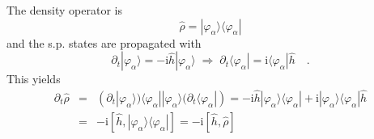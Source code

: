 \documentclass[final,1p]{elsarticle}
\begin{document}
The density operator is
\begin{equation}
  \hat{\rho}
  =
  |\varphi_\alpha\rangle\langle\varphi_\alpha|
\end{equation}
and the s.p. states are propagated with
\begin{equation}
  \partial_t|\varphi_\alpha\rangle
  =
  -\mathrm{i}\hat{h}|\varphi_\alpha\rangle
  \;\Rightarrow\;
  \partial_t\langle\varphi_\alpha|
  =
  \mathrm{i}\langle\varphi_\alpha|\hat{h}
  \quad.
\end{equation}
This yields
\begin{eqnarray*}
  \partial_t\hat{\rho}
  &=&
  (\partial_t|\varphi_\alpha\rangle)\langle\varphi_\alpha|
  |\varphi_\alpha\rangle(\partial_t\langle\varphi_\alpha|)
  =
  -\mathrm{i}\hat{h}|\varphi_\alpha\rangle\langle\varphi_\alpha|
  +\mathrm{i}|\varphi_\alpha\rangle\langle\varphi_\alpha|\hat{h}
\\
  &=&
  -\mathrm{i}\left[\hat{h},|\varphi_\alpha\rangle\langle\varphi_\alpha|\right]
  =
  -\mathrm{i}\left[\hat{h},\hat{\rho}\right]
\end{eqnarray*}
\end{document}
